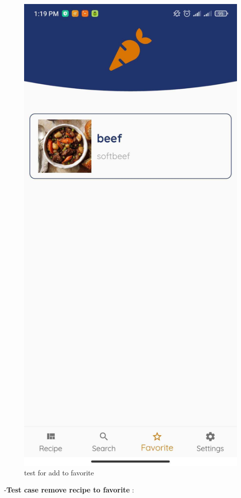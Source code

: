 \documentclass{article}
\begin{document}
\begin{figure}[h!]
    \includegraphics[scale=0.1]{Images/FavoriteList.jpg}
    \caption{test for add to favorite}
    \label{fig:cookingbook}
    \end{figure}
\newpage 
 -\textbf{Test case remove recipe to favorite }: \\
\end{document}
